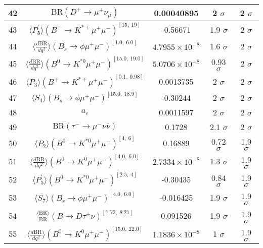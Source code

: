 \begin{longtable}{|c|c|c|c|c|}
42 &	 $\mathrm{BR}(D^+\to \mu^+\nu_\mu)$ &	 0.00040895 &	 \cellcolor{green!0}2 $ \sigma$ &	 2 $ \sigma$ \\ \hline
43 &	 $\langle P_5^\prime\rangle(B^+\to K^{\ast +}\mu^+\mu^-)^{[15,\  19]}$ &	 -0.56671 &	 \cellcolor{green!7}1.9 $ \sigma$ &	 2 $ \sigma$ \\ \hline
44 &	 $\langle \frac{d\overline{\mathrm{BR}}}{dq^2} \rangle(B_s\to \phi \mu^+\mu^-)^{[1.0,\  6.0]}$ &	 $4.7955\times 10^{-8}$ &	 \cellcolor{green!18}1.6 $ \sigma$ &	 2 $ \sigma$ \\ \hline
45 &	 $\langle \frac{d\mathrm{BR}}{dq^2} \rangle(B^0\to K^{\ast 0}\mu^+\mu^-)^{[15.0,\  19.0]}$ &	 $5.0706\times 10^{-8}$ &	 \cellcolor{green!50}0.93 $ \sigma$ &	 2 $ \sigma$ \\ \hline
46 &	 $\langle P_3\rangle(B^+\to K^{\ast +}\mu^+\mu^-)^{[0.1,\  0.98]}$ &	 0.0013735 &	 \cellcolor{green!0}2 $ \sigma$ &	 2 $ \sigma$ \\ \hline
47 &	 $\langle \overline{S_4}\rangle(B_s\to \phi \mu^+\mu^-)^{[15.0,\  18.9]}$ &	 -0.30244 &	 \cellcolor{green!0}2 $ \sigma$ &	 2 $ \sigma$ \\ \hline
48 &	 $a_e$ &	 0.0011597 &	 2 $ \sigma$ &	 2 $ \sigma$ \\ \hline
49 &	 $\mathrm{BR}(\tau^-\to \mu^- \nu\bar\nu)$ &	 0.1728 &	 \cellcolor{red!9}2.1 $ \sigma$ &	 2 $ \sigma$ \\ \hline
50 &	 $\langle P_2\rangle(B^0\to K^{\ast 0}\mu^+\mu^-)^{[4,\  6]}$ &	 0.16889 &	 \cellcolor{green!50}0.72 $ \sigma$ &	 1.9 $ \sigma$ \\ \hline
51 &	 $\langle \frac{d\mathrm{BR}}{dq^2} \rangle(B^0\to K^0\mu^+\mu^-)^{[4.0,\  6.0]}$ &	 $2.7334\times 10^{-8}$ &	 \cellcolor{green!30}1.3 $ \sigma$ &	 1.9 $ \sigma$ \\ \hline
52 &	 $\langle P_5^\prime\rangle(B^0\to K^{\ast 0}\mu^+\mu^-)^{[2.5,\  4]}$ &	 -0.30435 &	 \cellcolor{green!50}0.84 $ \sigma$ &	 1.9 $ \sigma$ \\ \hline
53 &	 $\langle \overline{S_7}\rangle(B_s\to \phi \mu^+\mu^-)^{[4.0,\  6.0]}$ &	 -0.016425 &	 \cellcolor{red!1}1.9 $ \sigma$ &	 1.9 $ \sigma$ \\ \hline
54 &	 $\frac{\langle \mathrm{BR} \rangle}{\mathrm{BR}}(B\to D\tau^+\nu)^{[7.73,\  8.27]}$ &	 0.091526 &	 \cellcolor{green!0}1.9 $ \sigma$ &	 1.9 $ \sigma$ \\ \hline
55 &	 $\langle \frac{d\mathrm{BR}}{dq^2} \rangle(B^0\to K^0\mu^+\mu^-)^{[15.0,\  22.0]}$ &	 $1.1836\times 10^{-8}$ &	 \cellcolor{green!43}1 $ \sigma$ &	 1.9 $ \sigma$ \\ \hline

\end{longtable}
